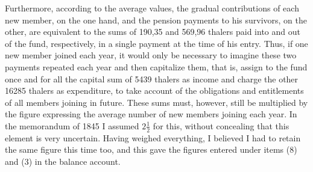 Furthermore, according to the average values, the gradual contributions of each new member, on the one hand, and the pension payments to his survivors, on the other, are equivalent to the sums of 190,35 and 569,96 thalers paid into and out of the fund, respectively, in a single payment at the time of his entry. Thus, if one new member joined each year, it would only be necessary to imagine these two payments repeated each year and then capitalize them, that is, assign to the fund once and for all the capital sum of 5439 thalers as income and charge the other 16285 thalers as expenditure, to take account of the obligations and entitlements of all members joining in future. These sums must, however, still be multiplied by the figure expressing the average number of new members joining each year. In the memorandum of 1845 I assumed \(2\tfrac{1}{2}\) for this, without concealing that this element is very uncertain. Having weighed everything, I believed I had to retain the same figure this time too, and this gave the figures entered under items (8) and (3) in the balance account.
